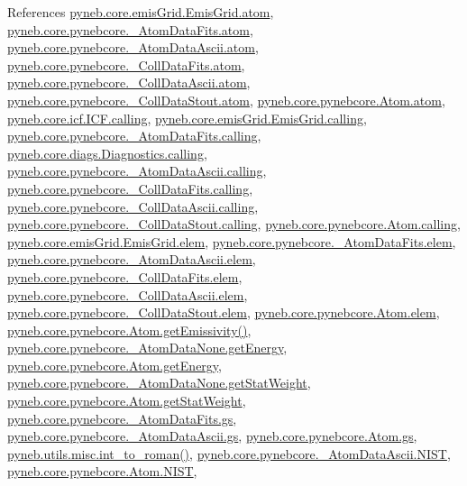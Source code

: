 References \hyperlink{emis_grid_8py_source_l00051}{pyneb.\-core.\-emis\-Grid.\-Emis\-Grid.\-atom}, \hyperlink{pynebcore_8py_source_l00089}{pyneb.\-core.\-pynebcore.\-\_\-\-Atom\-Data\-Fits.\-atom}, \hyperlink{pynebcore_8py_source_l00310}{pyneb.\-core.\-pynebcore.\-\_\-\-Atom\-Data\-Ascii.\-atom}, \hyperlink{pynebcore_8py_source_l00576}{pyneb.\-core.\-pynebcore.\-\_\-\-Coll\-Data\-Fits.\-atom}, \hyperlink{pynebcore_8py_source_l00926}{pyneb.\-core.\-pynebcore.\-\_\-\-Coll\-Data\-Ascii.\-atom}, \hyperlink{pynebcore_8py_source_l01162}{pyneb.\-core.\-pynebcore.\-\_\-\-Coll\-Data\-Stout.\-atom}, \hyperlink{pynebcore_8py_source_l01218}{pyneb.\-core.\-pynebcore.\-Atom.\-atom}, \hyperlink{icf_8py_source_l00016}{pyneb.\-core.\-icf.\-I\-C\-F.\-calling}, \hyperlink{emis_grid_8py_source_l00044}{pyneb.\-core.\-emis\-Grid.\-Emis\-Grid.\-calling}, \hyperlink{pynebcore_8py_source_l00097}{pyneb.\-core.\-pynebcore.\-\_\-\-Atom\-Data\-Fits.\-calling}, \hyperlink{diags_8py_source_l00169}{pyneb.\-core.\-diags.\-Diagnostics.\-calling}, \hyperlink{pynebcore_8py_source_l00318}{pyneb.\-core.\-pynebcore.\-\_\-\-Atom\-Data\-Ascii.\-calling}, \hyperlink{pynebcore_8py_source_l00585}{pyneb.\-core.\-pynebcore.\-\_\-\-Coll\-Data\-Fits.\-calling}, \hyperlink{pynebcore_8py_source_l00936}{pyneb.\-core.\-pynebcore.\-\_\-\-Coll\-Data\-Ascii.\-calling}, \hyperlink{pynebcore_8py_source_l01156}{pyneb.\-core.\-pynebcore.\-\_\-\-Coll\-Data\-Stout.\-calling}, \hyperlink{pynebcore_8py_source_l01229}{pyneb.\-core.\-pynebcore.\-Atom.\-calling}, \hyperlink{emis_grid_8py_source_l00048}{pyneb.\-core.\-emis\-Grid.\-Emis\-Grid.\-elem}, \hyperlink{pynebcore_8py_source_l00090}{pyneb.\-core.\-pynebcore.\-\_\-\-Atom\-Data\-Fits.\-elem}, \hyperlink{pynebcore_8py_source_l00311}{pyneb.\-core.\-pynebcore.\-\_\-\-Atom\-Data\-Ascii.\-elem}, \hyperlink{pynebcore_8py_source_l00577}{pyneb.\-core.\-pynebcore.\-\_\-\-Coll\-Data\-Fits.\-elem}, \hyperlink{pynebcore_8py_source_l00927}{pyneb.\-core.\-pynebcore.\-\_\-\-Coll\-Data\-Ascii.\-elem}, \hyperlink{pynebcore_8py_source_l01163}{pyneb.\-core.\-pynebcore.\-\_\-\-Coll\-Data\-Stout.\-elem}, \hyperlink{pynebcore_8py_source_l01219}{pyneb.\-core.\-pynebcore.\-Atom.\-elem}, \hyperlink{pynebcore_8py_source_l01782}{pyneb.\-core.\-pynebcore.\-Atom.\-get\-Emissivity()}, \hyperlink{pynebcore_8py_source_l00066}{pyneb.\-core.\-pynebcore.\-\_\-\-Atom\-Data\-None.\-get\-Energy}, \hyperlink{pynebcore_8py_source_l01256}{pyneb.\-core.\-pynebcore.\-Atom.\-get\-Energy}, \hyperlink{pynebcore_8py_source_l00065}{pyneb.\-core.\-pynebcore.\-\_\-\-Atom\-Data\-None.\-get\-Stat\-Weight}, \hyperlink{pynebcore_8py_source_l01255}{pyneb.\-core.\-pynebcore.\-Atom.\-get\-Stat\-Weight}, \hyperlink{pynebcore_8py_source_l00137}{pyneb.\-core.\-pynebcore.\-\_\-\-Atom\-Data\-Fits.\-gs}, \hyperlink{pynebcore_8py_source_l00418}{pyneb.\-core.\-pynebcore.\-\_\-\-Atom\-Data\-Ascii.\-gs}, \hyperlink{pynebcore_8py_source_l01295}{pyneb.\-core.\-pynebcore.\-Atom.\-gs}, \hyperlink{misc_8py_source_l00055}{pyneb.\-utils.\-misc.\-int\-\_\-to\-\_\-roman()}, \hyperlink{pynebcore_8py_source_l00398}{pyneb.\-core.\-pynebcore.\-\_\-\-Atom\-Data\-Ascii.\-N\-I\-S\-T}, \hyperlink{pynebcore_8py_source_l01303}{pyneb.\-core.\-pynebcore.\-Atom.\-N\-I\-S\-T}, 